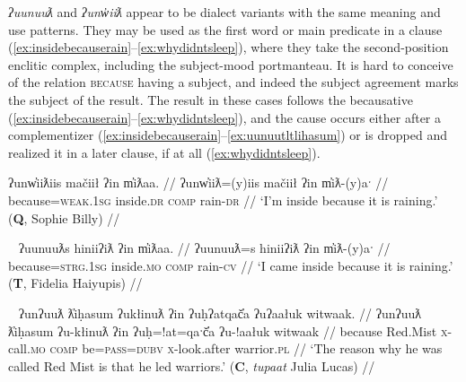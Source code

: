 \textit{ʔuunuuƛ} and \textit{ʔunw̓iiƛ} appear to be dialect variants with the same meaning and use patterns. They may be used as the first word or main predicate in a clause (\ref{ex:insidebecauserain}--\ref{ex:whydidntsleep}), where they take the second-position enclitic complex, including the subject-mood portmanteau. It is hard to conceive of the relation {\textsc{because}} having a subject, and indeed the subject agreement marks the subject of the result. The result in these cases follows the becausative (\ref{ex:insidebecauserain}--\ref{ex:whydidntsleep}), and the cause occurs either after a complementizer (\ref{ex:insidebecauserain}--\ref{ex:uunuutltlihasum}) or is dropped and realized it in a later clause, if at all (\ref{ex:whydidntsleep}).

\begin{comment}
\ex \label{ex:uunuutl0}
\begingl
\glpreamble wiiksinḥimaḥ teʔiłšiƛ ʔuunuuƛ wałaakqas c̓uumuʕas. //
\gla wik-L.sinḥi=(m)aˑḥ teʔił-šiƛ ʔuunuuƛ wałaak=qaˑs c̓uumuʕas //
\glb \textsc{neg}-try.to.do=\textsc{real.1sg} sick.\textsc{dr}-\textsc{mo} because go.\textsc{mo}=\textsc{defn.1sg} Port.Alberni //
\glft `I’m trying not to get sick because I am going to Port Alberni.' (\textbf{B}, Bob Mundy) //
\endgl
\xe
\end{comment}


\ex \label{ex:insidebecauserain}
\begingl
\glpreamble ʔunw̓iiƛiis mačiił ʔin m̓iƛaa. //
\gla ʔunw̓iiƛ=(y)iis mačiił ʔin m̓iƛ-(y)aˑ //
\glb because=\textsc{weak.1sg} inside.\textsc{dr} \textsc{comp} rain-\textsc{dr} //
\glft `I'm inside because it is raining.' (\textbf{Q}, Sophie Billy) //
\endgl
\xe

\ex~ \label{ex:inisidebecauserain2}
\begingl
\glpreamble ʔuunuuƛs hiniiʔiƛ ʔin m̓iƛaa. //
\gla ʔuunuuƛ=s hiniiʔiƛ ʔin m̓iƛ-(y)aˑ //
\glb because=\textsc{strg.1sg} inside.\textsc{mo} \textsc{comp} rain-\textsc{cv} //
\glft `I came inside because it is raining.' (\textbf{T}, Fidelia Haiyupis) //
\endgl
\xe

\ex~ \label{ex:uunuutltlihasum}
\begingl
\glpreamble ʔunʔuuƛ ƛ̓iḥasum ʔukłinuƛ ʔin ʔuḥʔatqač̓a ʔuʔaałuk witwaak. //
\gla ʔunʔuuƛ ƛ̓iḥasum ʔu-kłinuƛ ʔin ʔuḥ=!at=qaˑč̓a ʔu-!aałuk witwaak //
\glb because Red.Mist \textsc{x}-call.\textsc{mo} \textsc{comp} be=\textsc{pass}=\textsc{dubv} \textsc{x}-look.after warrior.\textsc{pl} //
\glft `The reason why he was called Red Mist is that he led warriors.' (\textbf{C}, \textit{tupaat} Julia Lucas) //
\endgl
\xe

